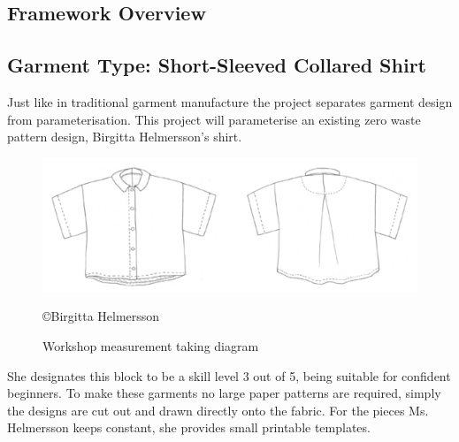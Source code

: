 \subsection{Framework Overview}

\subsection{Garment Type: Short-Sleeved Collared Shirt}
Just like in traditional garment manufacture the project separates garment design from parameterisation. This project will parameterise an existing zero waste pattern design, Birgitta Helmersson’s shirt.

\begin{figure} [H] %
    \centering %
    \includegraphics[width = \textwidth]{Images/finishedgarmentsilhoutte.png} %
    \caption{Workshop measurement taking diagram}
    \copyright {Birgitta Helmersson} %
\end{figure}
She designates this block to be a skill level 3 out of 5, being suitable for confident beginners. To make these garments no large paper patterns are required, simply the designs are cut out and drawn directly onto the fabric. For the pieces Ms. Helmersson keeps constant, she provides small printable templates.

